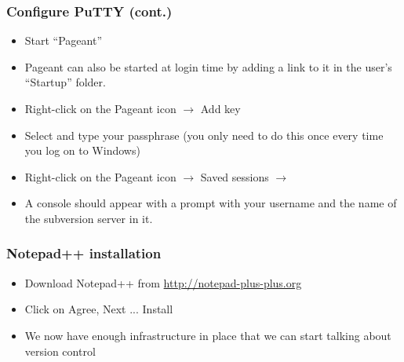 \begin{frame}[fragile]
    \frametitle{Configure PuTTY (cont.)}

    \begin{itemize}
        \item Start \enquote{Pageant}
        \item Pageant can also be started at login time by adding a link to
            it in the user's \enquote{Startup} folder.
        \item Right-click on the Pageant icon $\rightarrow$ Add key
        \item Select  and type your passphrase (you only need
            to do this once every time you log on to Windows)
        \item Right-click on the Pageant icon $\rightarrow$ Saved sessions
            $\rightarrow$ 
        \item A console should appear with a prompt with your username and
            the name of the subversion server in it.
    \end{itemize}
\end{frame}

\begin{frame}
    \frametitle{Notepad++ installation}
    \begin{itemize}
	\item Download Notepad++ from \url{http://notepad-plus-plus.org}
	\item Click on Agree, Next ... Install
    \end{itemize}

    \begin{itemize}
        \item We now have enough infrastructure in place that we can start
            talking about version control
    \end{itemize}
\end{frame}

